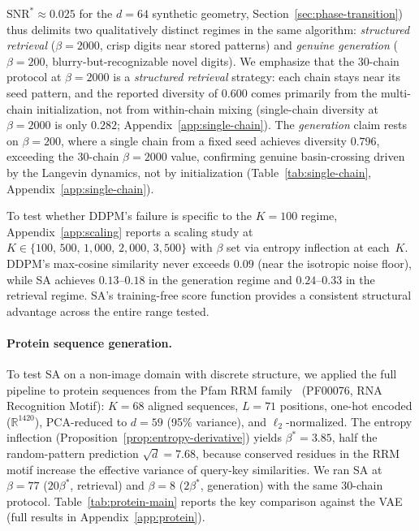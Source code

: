 $\mathrm{SNR}^{*}\approx 0.025$ for the $d{=}64$ synthetic geometry, Section~\ref{sec:phase-transition}) thus delimits two qualitatively distinct regimes in the same algorithm: \emph{structured retrieval} ($\beta{=}2000$, crisp digits near stored patterns) and \emph{genuine generation} ($\beta{=}200$, blurry-but-recognizable novel digits). We emphasize that the 30-chain protocol at $\beta{=}2000$ is a \emph{structured retrieval} strategy: each chain stays near its seed pattern, and the reported diversity of $0.600$ comes primarily from the multi-chain initialization, not from within-chain mixing (single-chain diversity at $\beta{=}2000$ is only $0.282$; Appendix~\ref{app:single-chain}). The \emph{generation} claim rests on $\beta{=}200$, where a single chain from a fixed seed achieves diversity $0.796$, exceeding the 30-chain $\beta{=}2000$ value, confirming genuine basin-crossing driven by the Langevin dynamics, not by initialization (Table~\ref{tab:single-chain}, Appendix~\ref{app:single-chain}).

To test whether DDPM's failure is specific to the $K{=}100$ regime, Appendix~\ref{app:scaling} reports a scaling study at $K\in\{100,\,500,\,1{,}000,\,2{,}000,\,3{,}500\}$ with $\beta$ set via entropy inflection at each~$K$. DDPM's max-cosine similarity never exceeds $0.09$ (near the isotropic noise floor), while SA achieves $0.13$--$0.18$ in the generation regime and $0.24$--$0.33$ in the retrieval regime. SA's training-free score function provides a consistent structural advantage across the entire range tested.

\paragraph{Protein sequence generation.}
To test SA on a non-image domain with discrete structure, we applied the full pipeline to protein sequences from the Pfam RRM family~\cite{mistryPfamProteinFamilies2021} (PF00076, RNA Recognition Motif): $K{=}68$ aligned sequences, $L{=}71$ positions, one-hot encoded ($\mathbb{R}^{1420}$), PCA-reduced to $d{=}59$ (95\% variance), and $\ell_2$-normalized. The entropy inflection (Proposition~\ref{prop:entropy-derivative}) yields $\beta^*{=}3.85$, half the random-pattern prediction $\sqrt{d}{=}7.68$, because conserved residues in the RRM motif increase the effective variance of query-key similarities. We ran SA at $\beta{=}77$ ($20\beta^*$, retrieval) and $\beta{=}8$ ($2\beta^*$, generation) with the same 30-chain protocol. Table~\ref{tab:protein-main} reports the key comparison against the VAE (full results in Appendix~\ref{app:protein}).

